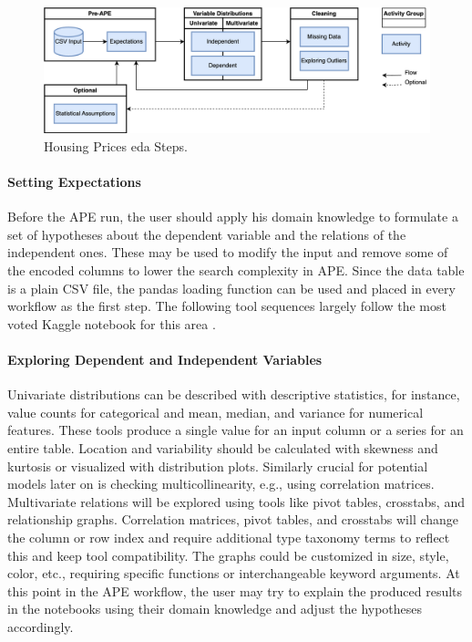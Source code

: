 \begin{figure}
    \centering
    \includegraphics[width=\linewidth]{Tex/images/housing.png}
    \caption{Housing Prices \ac{eda} Steps.}
    \label{fig:usecase_housing}
\end{figure}
\paragraph{Setting Expectations}
Before the APE run, the user should apply his domain knowledge to formulate a set of hypotheses about the dependent variable and the relations of the independent ones. These may be used to modify the input and remove some of the encoded columns to lower the search complexity in APE. Since the data table is a plain CSV file, the pandas loading function can be used and placed in every workflow as the first step. The following tool sequences largely follow the most voted Kaggle notebook for this area \cite{housingprices}.

\paragraph{Exploring Dependent and Independent Variables}
Univariate distributions can be described with descriptive statistics, for instance, value counts for categorical and mean, median, and variance for numerical features. These tools produce a single value for an input column or a series for an entire table. Location and variability should be calculated with skewness and kurtosis or visualized with distribution plots. Similarly crucial for potential models later on is checking multicollinearity, e.g., using correlation matrices. Multivariate relations will be explored using tools like pivot tables, crosstabs, and relationship graphs. Correlation matrices, pivot tables, and crosstabs will change the column or row index and require additional type taxonomy terms to reflect this and keep tool compatibility. The graphs could be customized in size, style, color, etc., requiring specific functions or interchangeable keyword arguments. At this point in the APE workflow, the user may try to explain the produced results in the notebooks using their domain knowledge and adjust the hypotheses accordingly.

